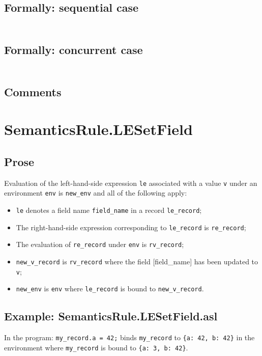 \documentclass{book}
\begin{document}
  \subsection{Formally: sequential case}
  \begin{align}
  \end{align} 

  \subsection{Formally: concurrent case}
  \begin{align}
  \end{align} 

    \subsection{Comments}

\section{SemanticsRule.LESetField \label{sec:SemanticsRule.LESetField}}

    \subsection{Prose}
    Evaluation of the left-hand-side expression \texttt{le} associated with a
value \texttt{v} under an environment \texttt{env} is \texttt{new\_env} and all
of the following apply:
    \begin{itemize}
    \item \texttt{le} denotes a field name \texttt{field\_name} in a record \texttt{le\_record};
    \item The right-hand-side expression corresponding to \texttt{le\_record} is
      \texttt{re\_record};
    \item The evaluation of \texttt{re\_record} under \texttt{env} is \texttt{rv\_record};
    \item \texttt{new\_v\_record} is \texttt{rv\_record} where the field [field\_name] has been
      updated to \texttt{v};
    \item \texttt{new\_env} is \texttt{env} where \texttt{le\_record} is bound to
      \texttt{new\_v\_record}.
    \end{itemize}

    \subsection{Example: SemanticsRule.LESetField.asl}
    In the program:
    \texttt{my\_record.a = 42;} binds \texttt{my\_record} to \texttt{\{a: 42, b: 42\}} in the environment where \texttt{my\_record} is bound to \texttt{\{a: 3, b: 42\}}.
\end{document}
